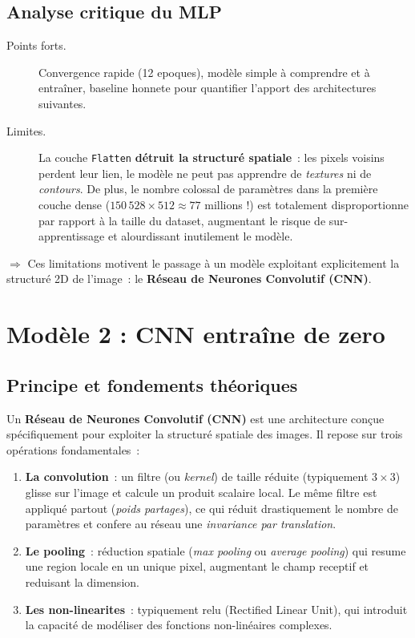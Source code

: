 \documentclass[12pt,a4paper,openany]{report}
\begin{document}
\subsection{Analyse critique du MLP}

\begin{description}
    \item[Points forts.] Convergence rapide (12 epoques), modèle simple à comprendre et à entraîner, baseline honnete pour quantifier l'apport des architectures suivantes.
    \item[Limites.] La couche \texttt{Flatten} \textbf{détruit la structuré spatiale}~: les pixels voisins perdent leur lien, le modèle ne peut pas apprendre de \emph{textures} ni de \emph{contours}. De plus, le nombre colossal de paramètres dans la première couche dense ($150\,528 \times 512 \approx 77$ millions !) est totalement disproportionne par rapport à la taille du dataset, augmentant le risque de sur-apprentissage et alourdissant inutilement le modèle.
\end{description}

$\Rightarrow$ Ces limitations motivent le passage à un modèle exploitant explicitement la structuré 2D de l'image~: le \textbf{Réseau de Neurones Convolutif (CNN)}.

\section{Modèle 2 : CNN entraîne de zero}

\subsection{Principe et fondements théoriques}

Un \textbf{Réseau de Neurones Convolutif (CNN)} \cite{lecun1998} est une architecture conçue spécifiquement pour exploiter la structuré spatiale des images. Il repose sur trois opérations fondamentales~:

\begin{enumerate}
    \item \textbf{La convolution}~: un filtre (ou \emph{kernel}) de taille réduite (typiquement $3\times 3$) glisse sur l'image et calcule un produit scalaire local. Le même filtre est appliqué partout (\emph{poids partages}), ce qui réduit drastiquement le nombre de paramètres et confere au réseau une \emph{invariance par translation}.
    \item \textbf{Le pooling}~: réduction spatiale (\emph{max pooling} ou \emph{average pooling}) qui resume une region locale en un unique pixel, augmentant le champ receptif et reduisant la dimension.
    \item \textbf{Les non-linearites}~: typiquement \gls{relu} (Rectified Linear Unit), qui introduit la capacité de modéliser des fonctions non-linéaires complexes.
\end{enumerate}
\end{document}
